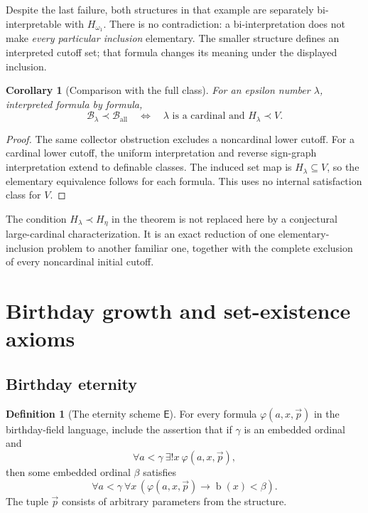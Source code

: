 \documentclass[11pt,letterpaper]{article}
\newtheorem{corollary}[theorem]{Corollary}
\theoremstyle{definition}
\newtheorem{definition}[theorem]{Definition}
\theoremstyle{remark}
\newcommand{\bd}{\operatorname{b}}
\newcommand{\B}{\mathcal B}
\newcommand{\Etern}{\mathsf E}
\begin{document}
Despite the last failure, both structures in that example are separately
bi-interpretable with $H_{\omega_1}$. There is no contradiction: a
bi-interpretation does not make \emph{every particular inclusion} elementary.
The smaller structure defines an interpreted cutoff set; that formula changes
its meaning under the displayed inclusion.

\begin{corollary}[Comparison with the full class]
For an epsilon number $\lambda$, interpreted formula by formula,
\[
 \B_\lambda\prec\B_{\mathrm{all}}
 \quad\Longleftrightarrow\quad
 \lambda\text{ is a cardinal and }H_\lambda\prec V.
\]
\end{corollary}
\begin{proof}
The same collector obstruction excludes a noncardinal lower cutoff. For a
cardinal lower cutoff, the uniform interpretation and reverse sign-graph
interpretation extend to definable classes. The induced set map is
$H_\lambda\subseteq V$, so the elementary equivalence follows for each
formula. This uses no internal satisfaction class for $V$.
\end{proof}

The condition $H_\lambda\prec H_\eta$ in the theorem is not replaced here by
a conjectural large-cardinal characterization. It is an exact reduction of
one elementary-inclusion problem to another familiar one, together with the
complete exclusion of every noncardinal initial cutoff.

\section{Birthday growth and set-existence axioms}
\label{sec:growth}

\subsection{Birthday eternity}

\begin{definition}[The eternity scheme $\Etern$]
For every formula $\varphi(a,x,\vec p)$ in the birthday-field language,
include the assertion that if $\gamma$ is an embedded ordinal and
\[
 \forall a<\gamma\ \exists!x\ \varphi(a,x,\vec p),
\]
then some embedded ordinal $\beta$ satisfies
\[
 \forall a<\gamma\ \forall x\,
       (\varphi(a,x,\vec p)\longrightarrow\bd(x)<\beta).
\]
The tuple $\vec p$ consists of arbitrary parameters from the structure.
\end{definition}
\end{document}
